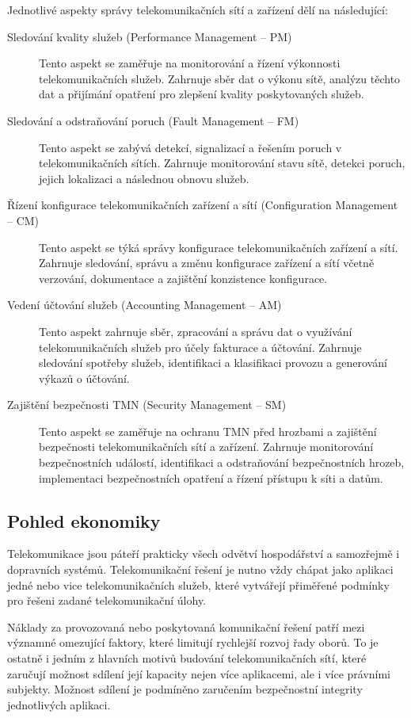 Jednotlivé aspekty správy telekomunikačních sítí a zařízení dělí na následující:
\begin{description}
    \item[Sledování kvality služeb (Performance Management -- PM)] Tento aspekt se zaměřuje na monitorování a řízení výkonnosti telekomunikačních služeb. Zahrnuje sběr dat o výkonu sítě, analýzu těchto dat a přijímání opatření pro zlepšení kvality poskytovaných služeb.
    \item[Sledování a odstraňování poruch (Fault Management -- FM)] Tento aspekt se zabývá detekcí, signalizací a řešením poruch v telekomunikačních sítích. Zahrnuje monitorování stavu sítě, detekci poruch, jejich lokalizaci a následnou obnovu služeb.
    \item[Řízení konfigurace telekomunikačních zařízení a sítí (Configuration Management -- CM)] Tento aspekt se týká správy konfigurace telekomunikačních zařízení a sítí. Zahrnuje sledování, správu a změnu konfigurace zařízení a sítí včetně verzování, dokumentace a zajištění konzistence konfigurace.
    \item[Vedení účtování služeb (Accounting Management -- AM)] Tento aspekt zahrnuje sběr, zpracování a správu dat o využívání telekomunikačních služeb pro účely fakturace a účtování. Zahrnuje sledování spotřeby služeb, identifikaci a klasifikaci provozu a generování výkazů o účtování.
    \item[Zajištění bezpečnosti TMN (Security Management -- SM)] Tento aspekt se zaměřuje na ochranu TMN před hrozbami a zajištění bezpečnosti telekomunikačních sítí a zařízení. Zahrnuje monitorování bezpečnostních událostí, identifikaci a odstraňování bezpečnostních hrozeb, implementaci bezpečnostních opatření a řízení přístupu k síti a datům.
\end{description}

\subsection{Pohled ekonomiky}
Telekomunikace jsou páteří prakticky všech odvětví hospodářství a samozřejmě i dopravních systémů. Telekomunikační řešení je nutno vždy chápat jako aplikaci jedné nebo vice telekomunikačních služeb, které vytvářejí přiměřené podmínky pro řešeni zadané telekomunikační úlohy.

Náklady za provozovaná nebo poskytovaná komunikační řešení patří mezi významné omezující faktory, které limitují rychlejší rozvoj řady oborů. To je ostatně i jedním z hlavních motivů budování telekomunikačních sítí, které zaručují možnost sdílení její kapacity nejen více aplikacemi, ale i více právními subjekty. Možnost sdílení je podmíněno zaručením bezpečnostní integrity jednotlivých aplikaci.


